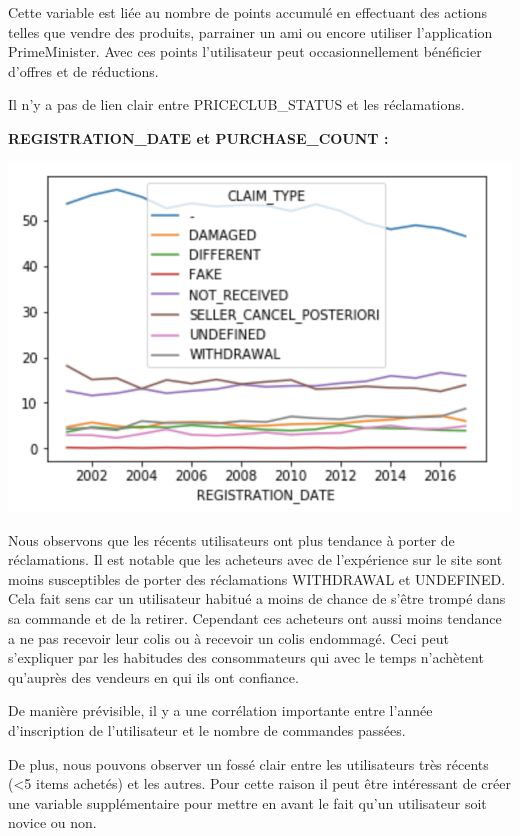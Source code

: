 Cette variable est liée au nombre de points accumulé en effectuant des actions telles que
vendre des produits, parrainer un ami ou encore utiliser l'application PrimeMinister.
Avec ces points l'utilisateur peut occasionnellement bénéficier d'offres et de réductions.

Il n'y a pas de lien clair entre PRICECLUB_STATUS et les réclamations.

\textbf{REGISTRATION_DATE et PURCHASE_COUNT :}

\begin{center}
\includegraphics[scale=0.5]{assets/registrationdate} 
\end{center}

Nous observons que les récents utilisateurs ont plus tendance à porter de réclamations.
Il est notable que les acheteurs avec de l'expérience sur le site sont moins susceptibles
de porter des réclamations WITHDRAWAL et UNDEFINED. Cela fait sens car un utilisateur 
habitué a moins de chance de s'être trompé dans sa commande et de la retirer.
Cependant ces acheteurs ont aussi moins tendance a ne pas recevoir leur colis ou à recevoir  
un colis endommagé. Ceci peut s'expliquer par les habitudes des consommateurs qui avec le 
temps n'achètent qu'auprès des vendeurs en qui ils ont confiance.

De manière prévisible, il y a une corrélation importante entre l'année d'inscription de
l'utilisateur et le nombre de commandes passées.

De plus, nous pouvons observer un fossé clair entre les utilisateurs très récents (<5 items 
achetés) et les autres. Pour cette raison il peut être intéressant de créer une variable
supplémentaire pour mettre en avant le fait qu'un utilisateur soit novice ou non.

